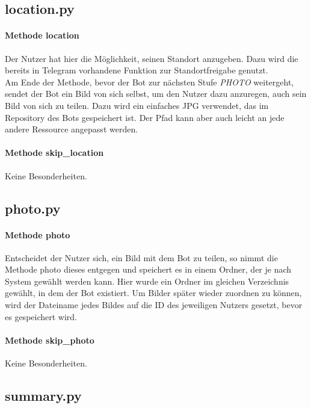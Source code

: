         
        \subsection{location.py}
            \paragraph{Methode location}
                Der Nutzer hat hier die Möglichkeit, seinen Standort anzugeben. Dazu wird die bereits in Telegram vorhandene Funktion zur Standortfreigabe genutzt. \\
                Am Ende der Methode, bevor der Bot zur nächsten Stufe \emph{PHOTO} weitergeht, sendet der Bot ein Bild von sich selbst, um den Nutzer dazu anzuregen, auch sein Bild von sich zu teilen. Dazu wird ein einfaches JPG verwendet, das im Repository des Bots gespeichert ist. Der Pfad kann aber auch leicht an jede andere Ressource angepasst werden.

            \paragraph{Methode skip\_location}
                Keine Besonderheiten.
        

        \subsection{photo.py}
            \paragraph{Methode photo}
                Entscheidet der Nutzer sich, ein Bild mit dem Bot zu teilen, so nimmt die Methode photo dieses entgegen und speichert es in einem Ordner, der je nach System gewählt werden kann. Hier wurde ein Ordner im gleichen Verzeichnis gewählt, in dem der Bot existiert. Um Bilder später wieder zuordnen zu können, wird der Dateiname jedes Bildes auf die ID des jeweiligen Nutzers gesetzt, bevor es gespeichert wird.

            \paragraph{Methode skip\_photo}
                Keine Besonderheiten.
        

        \subsection{summary.py}
